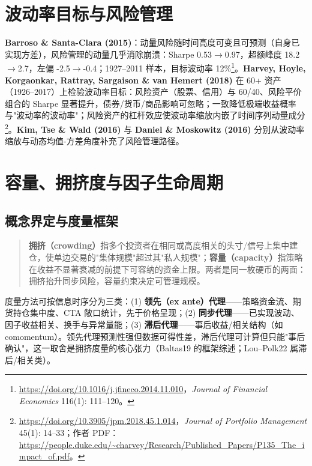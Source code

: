 \documentclass[11pt,a4paper]{article}
\begin{document}
\section{波动率目标与风险管理}
\textbf{Barroso \& Santa-Clara (2015)}：动量风险随时间高度可变且可预测（自身已实现方差），风险管理的动量几乎消除崩溃：Sharpe 0.53$\to$0.97，超额峰度 18.2$\to$2.7，左偏 -2.5$\to$-0.4；1927--2011 样本，目标波动率 12\%\footnote{\url{https://doi.org/10.1016/j.jfineco.2014.11.010}，\emph{Journal of Financial Economics} 116(1): 111--120。}。\textbf{Harvey, Hoyle, Korgaonkar, Rattray, Sargaison \& van Hemert (2018)} 在 60+ 资产（1926--2017）上检验波动率目标：风险资产（股票、信用）与 60/40、风险平价组合的 Sharpe 显著提升，债券/货币/商品影响可忽略；一致降低极端收益概率与"波动率的波动率"；风险资产的杠杆效应使波动率缩放内嵌了时间序列动量成分\footnote{\url{https://doi.org/10.3905/jpm.2018.45.1.014}，\emph{Journal of Portfolio Management} 45(1): 14--33；作者 PDF：\url{https://people.duke.edu/~charvey/Research/Published_Papers/P135_The_impact_of.pdf}。}。\textbf{Kim, Tse \& Wald (2016)} 与 \textbf{Daniel \& Moskowitz (2016)} 分别从波动率缩放与动态均值-方差角度补充了风险管理路径。

\section{容量、拥挤度与因子生命周期}

\subsection{概念界定与度量框架}
\begin{quote}\footnotesize
\textbf{拥挤（crowding）}指多个投资者在相同或高度相关的头寸/信号上集中建仓，使单边交易的"集体规模"超过其"私人规模"；\textbf{容量（capacity）}指策略在收益不显著衰减的前提下可容纳的资金上限。两者是同一枚硬币的两面：拥挤抬升同步风险，容量约束决定可管理规模。
\end{quote}
度量方法可按信息时序分为三类：(1) \textbf{领先（ex ante）代理}——策略资金流、期货持仓集中度、CTA 敞口统计，先于价格呈现；(2) \textbf{同步代理}——已实现波动、因子收益相关、换手与异常量能；(3) \textbf{滞后代理}——事后收益/相关结构（如 comomentum）。领先代理预测性强但数据可得性差，滞后代理可计算但只能"事后确认"，这一取舍是拥挤度量的核心张力（Baltas19 的框架综述；Lou--Polk22 属滞后/相关类）。
\end{document}
